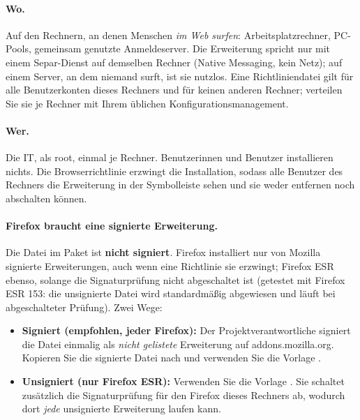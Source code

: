 \documentclass[11pt,a4paper]{article}
\begin{document}
\paragraph{Wo.} Auf den Rechnern, an denen Menschen \emph{im Web surfen}: Arbeitsplatzrechner,
PC-Pools, gemeinsam genutzte Anmeldeserver. Die Erweiterung spricht nur mit einem Separ-Dienst auf
demselben Rechner (Native Messaging, kein Netz); auf einem Server, an dem niemand surft, ist sie
nutzlos. Eine Richtliniendatei gilt für alle Benutzerkonten dieses Rechners und für keinen anderen
Rechner; verteilen Sie sie je Rechner mit Ihrem üblichen Konfigurationsmanagement.

\paragraph{Wer.} Die IT, als root, einmal je Rechner. Benutzerinnen und Benutzer installieren
nichts. Die Browserrichtlinie erzwingt die Installation, sodass alle Benutzer des Rechners die
Erweiterung in der Symbolleiste sehen und sie weder entfernen noch abschalten können.

\paragraph{Firefox braucht eine signierte Erweiterung.} Die Datei
 im Paket ist \textbf{nicht signiert}. Firefox
installiert nur von Mozilla signierte Erweiterungen, auch wenn eine Richtlinie sie erzwingt;
Firefox ESR ebenso, solange die Signaturprüfung nicht abgeschaltet ist (getestet mit Firefox ESR
153: die unsignierte Datei wird standardmäßig abgewiesen und läuft bei abgeschalteter Prüfung).
Zwei Wege:
\begin{itemize}
  \item \textbf{Signiert (empfohlen, jeder Firefox):} Der Projektverantwortliche signiert die Datei
    einmalig als \emph{nicht gelistete} Erweiterung auf addons.mozilla.org. Kopieren Sie die
    signierte Datei nach  und verwenden Sie
    die Vorlage .
  \item \textbf{Unsigniert (nur Firefox ESR):} Verwenden Sie die Vorlage
    . Sie schaltet zusätzlich die Signaturprüfung für den
    Firefox dieses Rechners ab, wodurch dort \emph{jede} unsignierte Erweiterung laufen kann.
\end{itemize}
\end{document}
